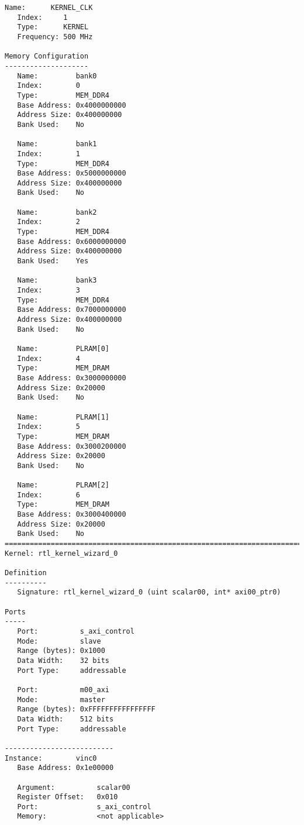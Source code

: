 \begin{lstlisting}[label=code:info_file, caption=Содержимое xclbin.info-файла, basicstyle=\tiny]
   Name:      KERNEL_CLK
   Index:     1
   Type:      KERNEL
   Frequency: 500 MHz

Memory Configuration
--------------------
   Name:         bank0
   Index:        0
   Type:         MEM_DDR4
   Base Address: 0x4000000000
   Address Size: 0x400000000
   Bank Used:    No

   Name:         bank1
   Index:        1
   Type:         MEM_DDR4
   Base Address: 0x5000000000
   Address Size: 0x400000000
   Bank Used:    No

   Name:         bank2
   Index:        2
   Type:         MEM_DDR4
   Base Address: 0x6000000000
   Address Size: 0x400000000
   Bank Used:    Yes

   Name:         bank3
   Index:        3
   Type:         MEM_DDR4
   Base Address: 0x7000000000
   Address Size: 0x400000000
   Bank Used:    No

   Name:         PLRAM[0]
   Index:        4
   Type:         MEM_DRAM
   Base Address: 0x3000000000
   Address Size: 0x20000
   Bank Used:    No

   Name:         PLRAM[1]
   Index:        5
   Type:         MEM_DRAM
   Base Address: 0x3000200000
   Address Size: 0x20000
   Bank Used:    No

   Name:         PLRAM[2]
   Index:        6
   Type:         MEM_DRAM
   Base Address: 0x3000400000
   Address Size: 0x20000
   Bank Used:    No
==============================================================================
Kernel: rtl_kernel_wizard_0

Definition
----------
   Signature: rtl_kernel_wizard_0 (uint scalar00, int* axi00_ptr0)

Ports
-----
   Port:          s_axi_control
   Mode:          slave
   Range (bytes): 0x1000
   Data Width:    32 bits
   Port Type:     addressable

   Port:          m00_axi
   Mode:          master
   Range (bytes): 0xFFFFFFFFFFFFFFFF
   Data Width:    512 bits
   Port Type:     addressable

--------------------------
Instance:        vinc0
   Base Address: 0x1e00000

   Argument:          scalar00
   Register Offset:   0x010
   Port:              s_axi_control
   Memory:            <not applicable>


\end{lstlisting}
